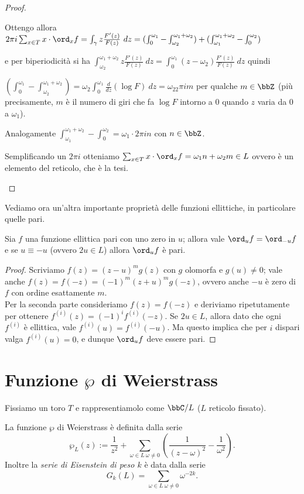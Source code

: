 \begin{proof}
\begin{enumerate}
    Ottengo allora $2\pi i\sum_{x\in T}x\cdot\ord_xf=\int_\gamma z\frac{F'(z)}{F(z)}\ dz=(\int_0^{\omega_1}-\int_{\omega_2}^{\omega_1+\omega_2})+(\int_{\omega_1}^{\omega_1+\omega_2}-\int_{0}^{\omega_2})$

    e per biperiodicità si ha $\int_{\omega_2}^{\omega_1+\omega_2}z\frac{F'(z)}{F(z)}\ dz=\int_0^{\omega_1}(z-\omega_2)\frac{F'(z)}{F(z)}\ dz$ quindi

    $(\int_0^{\omega_1}-\int_{\omega_2}^{\omega_1+\omega_2})=\omega_2\int_0^{\omega_1}\frac{d}{dz}(\log F)\ dz=\omega_22\pi i m$ per qualche $m\in\bbZ$
    (più precisamente, $m$ è il numero di giri che fa $\log F$ intorno a $0$ quando $z$ varia da $0$ a $\omega_1$).

    Analogamente $\int_{\omega_1}^{\omega_1+\omega_2}-\int_{0}^{\omega_2}=\omega_1\cdot 2\pi i n$ con $n\in\bbZ$.

    Semplificando un $2\pi i$ otteniamo $\sum_{x\in T}x\cdot\ord_xf=\omega_1n+\omega_2m\in L$ ovvero è un elemento del reticolo, che è la tesi.
\end{enumerate}
\end{proof}

Vediamo ora un'altra importante proprietà delle funzioni ellittiche, in particolare quelle pari.
\begin{proposizione}\label{fell-pari}
    Sia $f$ una funzione ellittica pari con uno zero in $u$; allora vale $\ord_uf=\ord_{-u}f$ e se $u\equiv-u$ (ovvero $2u\in L$) allora $\ord_u f$ è pari.
\end{proposizione}
\begin{proof}
    Scriviamo $f(z)=(z-u)^mg(z)$ con $g$ olomorfa e $g(u)\neq0$; vale anche $f(z)=f(-z)=(-1)^m(z+u)^mg(-z)$, ovvero anche $-u$ è zero di $f$ con ordine esattamente $m$.\\
    Per la seconda parte consideriamo $f(z)=f(-z)$ e deriviamo ripetutamente per ottenere $f^{(i)}(z)=(-1)^if^{(i)}(-z)$. Se $2u\in L$, allora dato che ogni $f^{(i)}$ è ellittica, vale $f^{(i)}(u)=f^{(i)}(-u)$. Ma questo implica che per $i$ dispari valga $f^{(i)}(u)=0$, e dunque $\ord_u f$ deve essere pari.
\end{proof}


\section{Funzione $\wp$ di Weierstrass}


Fissiamo un toro $T$ e rappresentiamolo come $\bbC/L$ ($L$ reticolo fissato).
\begin{definizione}
    La funzione $\wp$ di Weierstrass è definita dalla serie
	\[
		\wp_L(z):=\frac{1}{z^2}+\sum_{\omega\in L\ \omega\not=0}\left(\frac{1}{(z-\omega)^2}-\frac{1}{\omega^2} \right).
	\]
    Inoltre la \emph{serie di Eisenstein di peso $k$} è data dalla serie
	\[
		G_k(L)=\sum_{\omega\in L\ \omega\not=0}\omega^{-2k}.
	\]
\end{definizione}

